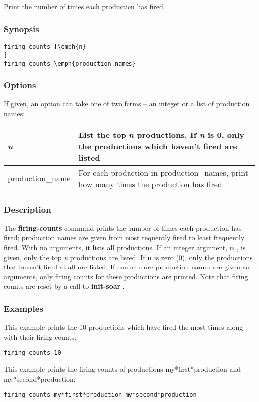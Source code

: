 \subsection{}
\label{firing-counts}
Print the number of times each production has fired. 
\subsubsection*{Synopsis}
\begin{verbatim}
firing-counts [\emph{n}
]
firing-counts \emph{production_names}
\end{verbatim}
\subsubsection*{Options}
 If given, an option can take one of two forms -- an integer or a list of production names: 
\begin{tabular}{|l|l|}
\hline 
\emph{n}
 & List the top \emph{n}
 productions. If \emph{n}
 is 0, only the productions which haven't fired are listed  \\
 \hline 
 production\_name  & For each production in production\_names, print how many times the production has fired  \\
 \hline 
\end{tabular}
\subsubsection*{Description}
 The \textbf{firing-counts}
 command prints the number of times each production has fired; production names are given from most requently fired to least frequently fired. With no arguments, it lists all productions. If an integer argument, \textbf{n}
, is given, only the top \emph{n}
 productions are listed. If \textbf{n}
 is zero (0), only the productions that haven't fired at all are listed. If one or more production names are given as arguments, only firing counts for these productions are printed. 
 Note that firing counts are reset by a call to \textbf{init-soar}
. 
\subsubsection*{Examples}
 This example prints the 10 productions which have fired the most times along with their firing counts: \begin{verbatim}
firing-counts 10
\end{verbatim}
 This example prints the firing counts of productions my*first*production and my*second*production: \begin{verbatim}
firing-counts my*first*production my*second*production
\end{verbatim}
